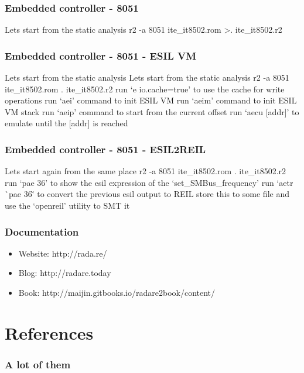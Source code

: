 \documentclass[10pt,pdf,utf8,english,compress,hyperref={unicode}]{beamer}
\begin{document}


\begin{frame}[fragile]
  \frametitle{Embedded controller - 8051}
  \center Lets start from the static analysis
  \center r2 -a 8051 ite\_it8502.rom
  \center \textgreater. ite\_it8502.r2
\end{frame}


\begin{frame}[fragile]
  \frametitle{Embedded controller - 8051 - ESIL VM}
\ifxetex
  \center Lets start from the static analysis
\else
  \center Lets start from the static analysis 
\fi
  \center r2 -a 8051 ite\_it8502.rom
  \center . ite\_it8502.r2
  \center run `e io.cache=true' to use the cache for write operations
  \center run `aei' command to init ESIL VM
  \center run `aeim' command to init ESIL VM stack
  \center run `aeip' command to start from the current offset
  \center run `aecu [addr]' to emulate until the [addr] is reached
\end{frame}

\begin{frame}[fragile]
  \frametitle{Embedded controller - 8051 - ESIL2REIL}
  \center Lets start again from the same place
  \center r2 -a 8051 ite\_it8502.rom
  \center . ite\_it8502.r2
  \center run `pae 36' to show the esil expression of the `set\_SMBus\_frequency'
  \center run `aetr \`{}pae 36\`' to convert the previous esil output to REIL
  \center store this to some file and use the `openreil' utility to SMT it
\end{frame}

\begin{frame}[fragile]
  \frametitle{Documentation}
    \begin{itemize}
    \item \alert{Website:} http://rada.re/
    \item \alert{Blog:} http://radare.today
    \item \alert{Book:} http://maijin.gitbooks.io/radare2book/content/
    \end{itemize}
\end{frame}

\ifxetex
\else
\section{References}
\begin{frame}[allowframebreaks]
	\frametitle{A lot of them}
	\printbibliography
\end{frame}
\fi
\end{document}
